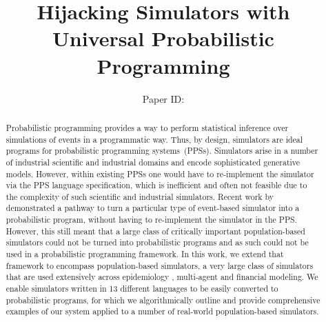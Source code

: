 \documentclass{article}
\title{Hijacking Simulators with Universal Probabilistic Programming}
\author{%
Paper ID: }
\begin{document}

\maketitle

\begin{abstract}


Probabilistic programming provides a way to perform statistical inference over simulations of events in a programmatic way. Thus, by design, simulators are ideal programs for probabilistic programming systems~(PPSs).
Simulators arise in a number of industrial scientific and industrial domains and encode sophisticated generative models.
However, within existing PPSs one would have to re-implement the simulator via the PPS language specification, which is inefficient and often not feasible due to the complexity of such scientific and industrial simulators.
Recent work by \cite{baydin2018efficient} demonstrated a pathway to turn a particular
type of event-based simulator into a probabilistic program, without having to re-implement the simulator in the PPS. 
 However, this still meant that a large class of critically important population-based simulators could not be turned into probabilistic programs and as such could not be used in a probabilistic programming framework.
In this work, we extend that framework to encompass population-based simulators, a very large class of simulators that are used extensively across epidemiology , multi-agent and financial modeling. 
We enable simulators written in 13 different languages to be easily converted to probabilistic programs, for which we algorithmically outline and provide comprehensive examples of our system applied to a number of real-world population-based simulators.


\end{abstract}
\end{document}
